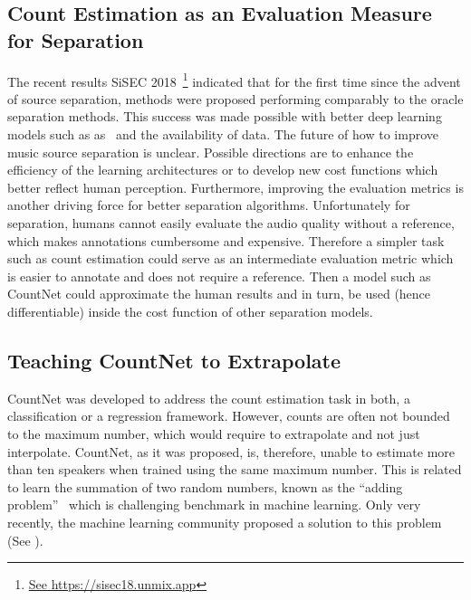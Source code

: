 \subsection*{Count Estimation as an Evaluation Measure for Separation}

The recent results SiSEC 2018~\cite{stoeter18sisec}\footnote{\url{See https://sisec18.unmix.app}} indicated that for the first time since the advent of source separation, methods were proposed performing comparably to the oracle separation methods.
This success was made possible with better deep learning models such as as~\cite{takahashi17} and the availability of data. 
The future of how to improve music source separation is unclear. Possible directions are to enhance the efficiency of the learning architectures or to develop new cost functions which better reflect human perception.
Furthermore, improving the evaluation metrics is another driving force for better separation algorithms. Unfortunately for separation, humans cannot easily evaluate the audio quality without a reference, which makes annotations cumbersome and expensive. 
Therefore a simpler task such as count estimation could serve as an intermediate evaluation metric which is easier to annotate and does not require a reference. Then a model such as CountNet could approximate the human results and in turn, be used (hence differentiable) inside the cost function of other separation models.

\subsection*{Teaching CountNet to Extrapolate}

CountNet was developed to address the count estimation task in both, a classification or a regression framework. 
However, counts are often not bounded to the maximum number, which would require to extrapolate and not just interpolate.
CountNet, as it was proposed, is, therefore, unable to estimate more than ten speakers when trained using the same maximum number. 
This is related to learn the summation of two random numbers, known as the ``adding problem''~\cite{Hochreiter97} which is challenging benchmark in machine learning. 
Only very recently, the machine learning community proposed a solution to this problem (See \cite{trask18}).